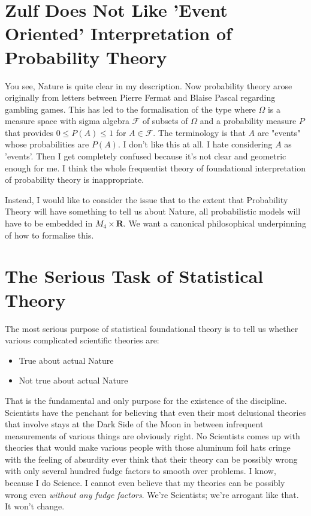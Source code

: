 \documentclass{amsart}
\begin{document}
\section{Zulf Does Not Like 'Event Oriented' Interpretation of Probability Theory}

You see, Nature is quite clear in my description.  Now probability theory arose originally from letters between Pierre Fermat and Blaise Pascal regarding gambling games.  This has led to the formalisation of the type where $\Omega$ is a measure space with sigma algebra $\mathcal{F}$ of subsets of $\Omega$ and a probability measure $P$ that provides $0 \le P(A) \le 1$ for $A \in \mathcal{F}$.  The terminology is that $A$ are "events" whose probabilities are $P(A)$.  I don't like this at all.  I hate considering $A$ as 'events'.  Then I get completely confused because it's not clear and geometric enough for me.  I think the whole frequentist theory of foundational interpretation of probability theory is inappropriate.

Instead, I would like to consider the issue that to the extent that Probability Theory will have something to tell us about Nature, all probabilistic models will have to be embedded in $M_4 \times \mathbf{R}$.  We want a canonical philosophical underpinning of how to formalise this.

\section{The Serious Task of Statistical Theory}

The most serious purpose of statistical foundational theory is to tell us whether various complicated scientific theories are:

\begin{itemize}
\item True about actual Nature
\item Not true about actual Nature
\end{itemize}

That is the fundamental and only purpose for the existence of the discipline.  Scientists have the penchant for believing that even their most delusional theories that involve stays at the Dark Side of the Moon in between infrequent measurements of various things are obviously right.  No Scientists comes up with theories that would make various people with those aluminum foil hats cringe with the feeling of absurdity ever think that their theory can be possibly wrong with only several hundred fudge factors to smooth over problems.  I know, because I do Science.  I cannot even believe that my theories can be possibly wrong even {\em without any fudge factors}.  We're Scientists; we're arrogant like that.  It won't change.
\end{document}
